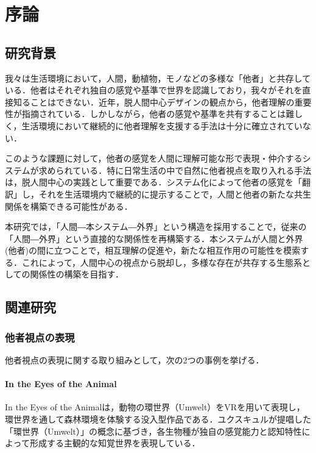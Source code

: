 \documentclass{cuxarticle}
\begin{document}
\begin{titlepage}
  
\end{titlepage}

\tableofcontents

\chapter{序論}

\section{研究背景}
我々は生活環境において，人間，動植物，モノなどの多様な「他者」と共存している．他者はそれぞれ独自の感覚や基準で世界を認識しており，我々がそれを直接知ることはできない．近年，脱人間中心デザインの観点から，他者理解の重要性が指摘されている．しかしながら，他者の感覚や基準を共有することは難しく，生活環境において継続的に他者理解を支援する手法は十分に確立されていない．

このような課題に対して，他者の感覚を人間に理解可能な形で表現・仲介するシステムが求められている．特に日常生活の中で自然に他者視点を取り入れる手法は，脱人間中心の実践として重要である．システム化によって他者の感覚を「翻訳」し，それを生活環境内で継続的に提示することで，人間と他者の新たな共生関係を構築できる可能性がある．

本研究では，「人間―本システム―外界」という構造を採用することで，従来の「人間―外界」という直接的な関係性を再構築する．本システムが人間と外界(他者)の間に立つことで，相互理解の促進や，新たな相互作用の可能性を模索する．これによって，人間中心の視点から脱却し，多様な存在が共存する生態系としての関係性の構築を目指す．

\section{関連研究}

\subsection{他者視点の表現}
他者視点の表現に関する取り組みとして，次の2つの事例を挙げる．

\subsubsection{In the Eyes of the Animal}
In the Eyes of the Animal\cite{--EyesAnimal}は，動物の環世界（Umwelt）をVRを用いて表現し，環世界を通して森林環境を体験する没入型作品である．ユクスキュルが提唱した「環世界（Umwelt）」の概念に基づき，各生物種が独自の感覚能力と認知特性によって形成する主観的な知覚世界を表現している．
\end{document}
